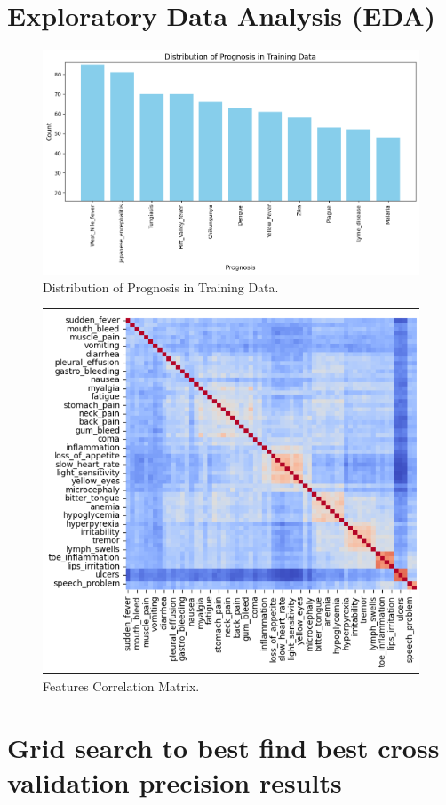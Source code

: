 \documentclass{article}
\begin{document}
\section{Exploratory Data Analysis (EDA)}
\onecolumn
\begin{figure}[h!]
\centering
\includegraphics[width=.8\linewidth]{Disease Distribution.png}
\caption{\label{fig:frog}Distribution of Prognosis in Training Data.}
\end{figure}
\begin{figure}[h!]
\centering
\includegraphics[width=.8\linewidth]{CorrelationMatrix.png}
\caption{\label{fig:frog}Features Correlation Matrix.}
\end{figure}
\twocolumn


\section{Grid search to best find best cross validation precision results}
\end{document}
